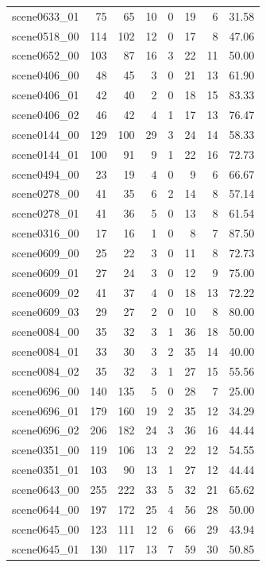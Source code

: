 \begin{table}[t]
\begin{tabular}{lrrrrrrr}
scene0633\_01 & 75 & 65 & 10 & 0 & 19 & 6 & 31.58 \\
scene0518\_00 & 114 & 102 & 12 & 0 & 17 & 8 & 47.06 \\
scene0652\_00 & 103 & 87 & 16 & 3 & 22 & 11 & 50.00 \\
scene0406\_00 & 48 & 45 & 3 & 0 & 21 & 13 & 61.90 \\
scene0406\_01 & 42 & 40 & 2 & 0 & 18 & 15 & 83.33 \\
scene0406\_02 & 46 & 42 & 4 & 1 & 17 & 13 & 76.47 \\
scene0144\_00 & 129 & 100 & 29 & 3 & 24 & 14 & 58.33 \\
scene0144\_01 & 100 & 91 & 9 & 1 & 22 & 16 & 72.73 \\
scene0494\_00 & 23 & 19 & 4 & 0 & 9 & 6 & 66.67 \\
scene0278\_00 & 41 & 35 & 6 & 2 & 14 & 8 & 57.14 \\
scene0278\_01 & 41 & 36 & 5 & 0 & 13 & 8 & 61.54 \\
scene0316\_00 & 17 & 16 & 1 & 0 & 8 & 7 & 87.50 \\
scene0609\_00 & 25 & 22 & 3 & 0 & 11 & 8 & 72.73 \\
scene0609\_01 & 27 & 24 & 3 & 0 & 12 & 9 & 75.00 \\
scene0609\_02 & 41 & 37 & 4 & 0 & 18 & 13 & 72.22 \\
scene0609\_03 & 29 & 27 & 2 & 0 & 10 & 8 & 80.00 \\
scene0084\_00 & 35 & 32 & 3 & 1 & 36 & 18 & 50.00 \\
scene0084\_01 & 33 & 30 & 3 & 2 & 35 & 14 & 40.00 \\
scene0084\_02 & 35 & 32 & 3 & 1 & 27 & 15 & 55.56 \\
scene0696\_00 & 140 & 135 & 5 & 0 & 28 & 7 & 25.00 \\
scene0696\_01 & 179 & 160 & 19 & 2 & 35 & 12 & 34.29 \\
scene0696\_02 & 206 & 182 & 24 & 3 & 36 & 16 & 44.44 \\
scene0351\_00 & 119 & 106 & 13 & 2 & 22 & 12 & 54.55 \\
scene0351\_01 & 103 & 90 & 13 & 1 & 27 & 12 & 44.44 \\
scene0643\_00 & 255 & 222 & 33 & 5 & 32 & 21 & 65.62 \\
scene0644\_00 & 197 & 172 & 25 & 4 & 56 & 28 & 50.00 \\
scene0645\_00 & 123 & 111 & 12 & 6 & 66 & 29 & 43.94 \\
scene0645\_01 & 130 & 117 & 13 & 7 & 59 & 30 & 50.85 \\

\end{tabular}
\end{table}
